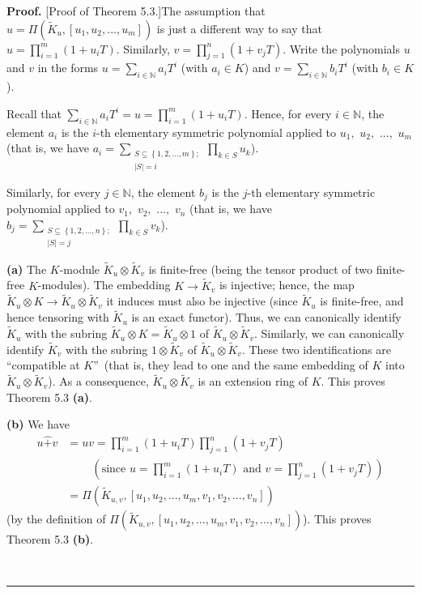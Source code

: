 \documentclass[numbers=enddot,12pt,final,onecolumn,notitlepage]{scrartcl}%
\newenvironment{proof}[1][Proof]{\noindent\textbf{#1.} }{\ \rule{0.5em}{0.5em}}
\begin{document}
\begin{proof}
[Proof of Theorem 5.3.]The assumption that $u=\Pi\left(  \widetilde{K}%
_{u},\left[  u_{1},u_{2},...,u_{m}\right]  \right)  $ is just a different way
to say that $u=\prod\limits_{i=1}^{m}\left(  1+u_{i}T\right)  $. Similarly,
$v=\prod\limits_{j=1}^{n}\left(  1+v_{j}T\right)  $. Write the polynomials $u$
and $v$ in the forms $u=\sum\limits_{i\in\mathbb{N}}a_{i}T^{i}$ (with
$a_{i}\in K$) and $v=\sum\limits_{i\in\mathbb{N}}b_{i}T^{i}$ (with $b_{i}\in
K$).

Recall that $\sum\limits_{i\in\mathbb{N}}a_{i}T^{i}=u=\prod\limits_{i=1}%
^{m}\left(  1+u_{i}T\right)  $. Hence, for every $i\in\mathbb{N}$, the element
$a_{i}$ is the $i$-th elementary symmetric polynomial applied to $u_{1},$
$u_{2},$ $...,$ $u_{m}$ (that is, we have $a_{i}=\sum
\limits_{\substack{S\subseteq\left\{  1,2,...,m\right\}  ;\\\left\vert
S\right\vert =i}}\prod\limits_{k\in S}u_{k}$).

Similarly, for every $j\in\mathbb{N}$, the element $b_{j}$ is the $j$-th
elementary symmetric polynomial applied to $v_{1},$ $v_{2},$ $...,$ $v_{n}$
(that is, we have $b_{j}=\sum\limits_{\substack{S\subseteq\left\{
1,2,...,n\right\}  ;\\\left\vert S\right\vert =j}}\prod\limits_{k\in S}v_{k}$).

\textbf{(a)} The $K$-module $\widetilde{K}_{u}\otimes\widetilde{K}_{v}$ is
finite-free (being the tensor product of two finite-free $K$-modules). The
embedding $K\rightarrow\widetilde{K}_{v}$ is injective; hence, the map
$\widetilde{K}_{u}\otimes K\rightarrow\widetilde{K}_{u}\otimes\widetilde{K}%
_{v}$ it induces must also be injective (since $\widetilde{K}_{u}$ is
finite-free, and hence tensoring with $\widetilde{K}_{u}$ is an exact
functor). Thus, we can canonically identify $\widetilde{K}_{u}$ with the
subring $\widetilde{K}_{u}\otimes K=\widetilde{K}_{u}\otimes1$ of
$\widetilde{K}_{u}\otimes\widetilde{K}_{v}$. Similarly, we can canonically
identify $\widetilde{K}_{v}$ with the subring $1\otimes\widetilde{K}_{v}$ of
$\widetilde{K}_{u}\otimes\widetilde{K}_{v}$. These two identifications are
\textquotedblleft compatible at $K$\textquotedblright\ (that is, they lead to
one and the same embedding of $K$ into $\widetilde{K}_{u}\otimes
\widetilde{K}_{v}$). As a consequence, $\widetilde{K}_{u}\otimes
\widetilde{K}_{v}$ is an extension ring of $K$. This proves Theorem 5.3
\textbf{(a)}.

\textbf{(b)} We have
\begin{align*}
u\widehat{+}v  &  =uv=\prod\limits_{i=1}^{m}\left(  1+u_{i}T\right)
\prod\limits_{j=1}^{n}\left(  1+v_{j}T\right) \\
&  \ \ \ \ \ \ \ \ \ \ \left(  \text{since }u=\prod\limits_{i=1}^{m}\left(
1+u_{i}T\right)  \text{ and }v=\prod\limits_{j=1}^{n}\left(  1+v_{j}T\right)
\right) \\
&  =\Pi\left(  \widetilde{K}_{u,v},\left[  u_{1},u_{2},...,u_{m},v_{1}%
,v_{2},...,v_{n}\right]  \right)
\end{align*}
(by the definition of $\Pi\left(  \widetilde{K}_{u,v},\left[  u_{1}%
,u_{2},...,u_{m},v_{1},v_{2},...,v_{n}\right]  \right)  $). This proves
Theorem 5.3 \textbf{(b)}.


\end{proof}
\end{document}
